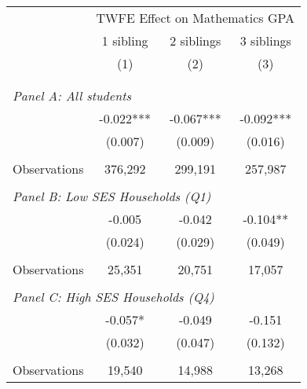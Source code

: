 \makeatletter
{}
{
\makeatother
\begin{tabular}{lccc}
\toprule
\cmidrule(lr){2-4}
& \multicolumn{3}{c}{TWFE Effect on Mathematics GPA} \\
\cmidrule(lr){2-4}
& 1 sibling & 2 siblings & 3 siblings  \\
\cmidrule(lr){2-2} \cmidrule(lr){3-3} \cmidrule(lr){4-4}
& (1) & (2) & (3)\\
\bottomrule
&  &  &  \\
&  &  &   \\
\multicolumn{4}{l}{\textit{Panel A: All students}} \\
\hspace{3mm}        &      -0.022***&      -0.067***&      -0.092***\\
                    &     (0.007)   &     (0.009)   &     (0.016)   \\
                    &               &               &               \\
\hspace{3mm}Observations&     376,292   &     299,191   &     257,987   \\
 
&  &  &   \\
\multicolumn{4}{l}{\textit{Panel B: Low SES Households (Q1)}} \\
\hspace{3mm}        &      -0.005   &      -0.042   &      -0.104** \\
                    &     (0.024)   &     (0.029)   &     (0.049)   \\
                    &               &               &               \\
\hspace{3mm}Observations&      25,351   &      20,751   &      17,057   \\
 
&  &  &   \\
\multicolumn{4}{l}{\textit{Panel C: High SES Households (Q4)}} \\
\hspace{3mm}        &      -0.057*  &      -0.049   &      -0.151   \\
                    &     (0.032)   &     (0.047)   &     (0.132)   \\
                    &               &               &               \\
\hspace{3mm}Observations&      19,540   &      14,988   &      13,268   \\
 

\end{tabular}}
